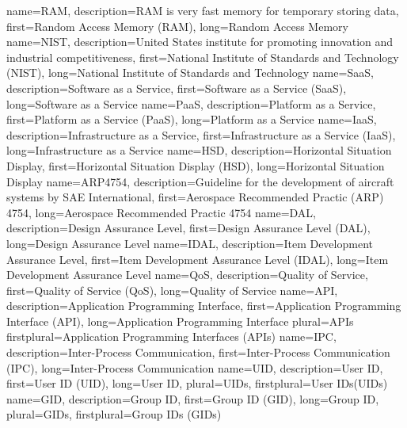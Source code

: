 {%
    name={RAM},
    description={RAM is very fast memory for temporary storing data},
    first={Random Access Memory (RAM)},
    long={Random Access Memory}
}
{%
    name={NIST},
    description={United States institute for promoting innovation and industrial competitiveness},
    first={National Institute of Standards and Technology (NIST)},
    long={National Institute of Standards and Technology}
}
{%
    name={SaaS},
    description={Software as a Service},
    first={Software as a Service (SaaS)},
    long={Software as a Service}
}
{%
    name={PaaS},
    description={Platform as a Service},
    first={Platform as a Service (PaaS)},
    long={Platform as a Service}
}
{%
    name={IaaS},
    description={Infrastructure as a Service},
    first={Infrastructure as a Service (IaaS)},
    long={Infrastructure as a Service}
}
{%
    name={HSD},
    description={Horizontal Situation Display},
    first={Horizontal Situation Display (HSD)},
    long={Horizontal Situation Display}
}
{%
    name={ARP4754},
    description={Guideline for the development of aircraft systems by SAE International},
    first={Aerospace Recommended Practic (ARP) 4754},
    long={Aerospace Recommended Practic 4754}
}
{%
    name={DAL},
    description={Design Assurance Level},
    first={Design Assurance Level (DAL)},
    long={Design Assurance Level}
}
{%
    name={IDAL},
    description={Item Development Assurance Level},
    first={Item Development Assurance Level (IDAL)},
    long={Item Development Assurance Level}
}
{%
    name={QoS},
    description={Quality of Service},
    first={Quality of Service (QoS)},
    long={Quality of Service}
}
{%
    name={API},
    description={Application Programming Interface},
    first={Application Programming Interface (API)},
    long={Application Programming Interface}
    plural={APIs}
    firstplural={Application Programming Interfaces (APIs)}
}
{%
    name={IPC},
    description={Inter-Process Communication},
    first={Inter-Process Communication (IPC)},
    long={Inter-Process Communication}
}
{%
    name={UID},
    description={User ID},
    first={User ID (UID)},
    long={User ID},
    plural={UIDs},
    firstplural={User IDs(UIDs)}
}
{%
    name={GID},
    description={Group ID},
    first={Group ID (GID)},
    long={Group ID},
    plural={GIDs},
    firstplural={Group IDs (GIDs)}
}
